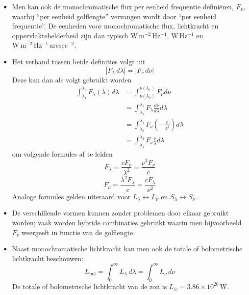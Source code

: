 \documentclass[10pt,a4paper]{article}
\renewenvironment{equation}{\begin{equation*}}{\end{equation*}}
\begin{document}
\begin{itemize}
  \item Men kan ook de monochromatische flux per eenheid frequentie defini\"eren, $F_\nu$, waarbij ``per eenheid golflengte'' vervangen wordt door ``per eenheid frequentie''. De eenheden voor monochromatische flux, lichtkracht en oppervlaktehelderheid zijn dan typisch $\mathrm{W\,m^{-2}\,Hz^{-1}}$, $\mathrm{W\,Hz^{-1}}$ en $\mathrm{W\,m^{-2}\,Hz^{-1}\,arcsec^{-2}}$.
  \item Het verband tussen beide definities volgt uit
  \begin{equation}
    \left|F_\lambda\,d\lambda\right| = \left|F_\nu\,d\nu\right|
    \tag{2.3}
  \end{equation}
  Deze kan dan als volgt gebruikt worden
  \begin{align*}
      \int_{\lambda_1}^{\lambda_2}F_\lambda(\lambda)d\lambda &=\int^{\nu(\lambda_1)}_{\nu(\lambda_2)}F_{\nu}d\nu\\
      &=\int_{\lambda_2}^{\lambda_1}F_\lambda\frac{d\nu}{d\lambda}d\lambda\\
      &=\int_{\lambda_2}^{\lambda_1}F_\nu\left(-\frac{c}{\lambda^2}\right)d\lambda\\
      &=\int_{\lambda_1}^{\lambda_2}F_{\nu}\frac{\nu}{\lambda}d\lambda
  \end{align*}
  om volgende formules af te leiden
  \begin{equation}
    F_\lambda = \frac{cF_\nu}{\lambda^2} = \frac{\nu^2 F_\nu}{c}
    \tag{2.4}
  \end{equation}
  \begin{equation}
    F_\nu = \frac{\lambda^2 F_\lambda}{c} = \frac{cF_\lambda}{\nu^2}
    \tag{2.5}
  \end{equation}
  Analoge formules gelden uiteraard voor $L_\lambda \leftrightarrow L_\nu$ en $S_\lambda \leftrightarrow S_\nu$.
  \item De verschillende vormen kunnen zonder problemen door elkaar gebruikt worden; vaak worden hybride combinaties gebruikt waarin men bijvoorbeeld $F_\nu$ weergeeft in functie van de golflengte.
  \item Naast monochromatische lichtkracht kan men ook de totale of bolometrische lichtkracht beschouwen:
  \begin{equation}
    L_{\mathrm{bol}} = \int_{0}^{\infty} L_\lambda\,d\lambda
    = \int_{0}^{\infty} L_\nu\,d\nu
    \tag{2.6}
  \end{equation}
  De totale of bolometrische lichtkracht van de zon is $L_\odot = 3.86 \times 10^{26}\,\mathrm{W}$.
\begin{figure}

\end{figure}
\end{itemize}
\end{document}

